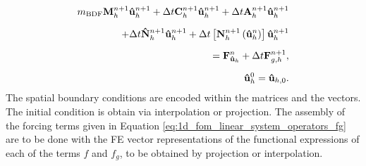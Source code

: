 \documentclass[../../thesis.tex]{subfiles}
\newcommand{\dt}{\ensuremath{\Delta t}}
\begin{document}
\begin{subequations}
    \begin{align}
        \label{eq:1d_fom_weak_formulation_discrete}
        m_{\text{BDF}} \vb{M}^{n+1}_h \vb{\hat{u}}_{h}^{n+1} 
        + \dt \vb{C}^{n+1}_h \vb{\hat{u}}_{h}^{n+1} 
        + \dt \vb{A}^{n+1}_h \vb{\hat{u}}_{h}^{n+1} 
        \nonumber 
        \\[2mm] 
        + \dt \vb{\hat{N}}^{n+1}_h \vb{\hat{u}}_{h}^{n+1} 
        + \dt \left[\vb{N}^{n+1}_h\left(\vb{\hat{u}}_{h}^{n}\right)\right] \vb{\hat{u}}_{h}^{n+1} 
        \nonumber
        \\[2mm] 
        = \vb{F}_{\vb{\hat{u}}_h}^{n}
        + \dt \vb{F}_{g,h}^{n+1}, 
        \\[2mm]
        \vb{\hat{u}}_h^{0} = \vb{\hat{u}}_{h,0}.
    \end{align}
\end{subequations}
The spatial boundary conditions are encoded within the matrices and the vectors. 
The initial condition is obtain via interpolation or projection.
The assembly of the forcing terms given in Equation \eqref{eq:1d_fom_linear_system_operators_fg}
are to be done with the FE vector representations of the functional expressions of each of the terms $f$ and $f_g$, to be obtained by projection or interpolation.
\end{document}
